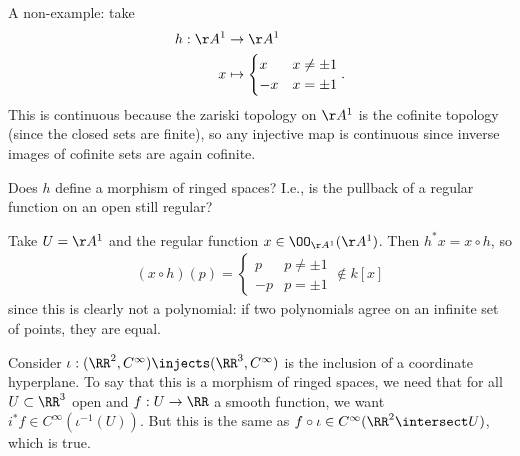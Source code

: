 \begin{example}

A non-example: take
\begin{align*}  
h: \AA^1 &\to \AA^1 \\
x & \mapsto 
\begin{cases}
x & x \neq \pm 1 \\
-x & x= \pm 1
\end{cases}
.\end{align*} This is continuous because the zariski topology on
\(\AA^1\) is the cofinite topology (since the closed sets are finite),
so any injective map is continuous since inverse images of cofinite sets
are again cofinite.

\begin{question}

Does \(h\) define a morphism of ringed spaces? I.e., is the pullback of
a regular function on an open still regular?

\end{question}

\begin{answer}

Take \(U = \AA^1\) and the regular function \(x\in \OO_{\AA^1}(\AA^1)\).
Then \(h^*x = x\circ h\), so
\begin{align*}  
(x\circ h)(p) =
\begin{cases}
p & p\neq \pm 1 \\
-p & p= \pm 1 
\end{cases}
\not \in k[x]
\end{align*} since this is clearly not a polynomial: if two polynomials
agree on an infinite set of points, they are equal.

\end{answer}

\end{example}

\begin{example}

Consider \(\iota: (\RR^2, C^\infty) \injects (\RR^3, C^\infty)\) is the
inclusion of a coordinate hyperplane. To say that this is a morphism of
ringed spaces, we need that for all \(U\subset \RR^3\) open and
\(f:U\to \RR\) a smooth function, we want
\(i^* f\in C^\infty (\iota^{-1}(U))\). But this is the same as
\(f\circ \iota \in C^\infty(\RR^2\intersect U)\), which is true.

\end{example}

